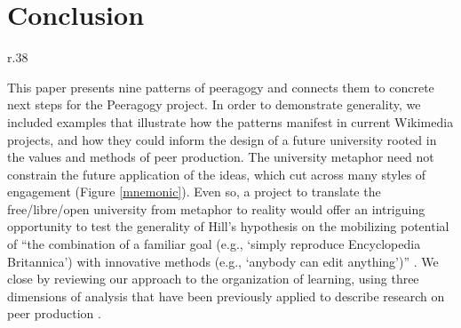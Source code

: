 \section{Conclusion}\label{sec:Conclusion}




\begin{wrapfigure}{r}{.38\textwidth}
\vspace{-2.6cm}
\resizebox{.37\textwidth}{!}{

}
\vspace{-2.5cm}
\captionsetup{font=footnotesize,width=.45\textwidth}
\caption{Mnemonic \label{mnemonic}}
\vspace{-.5cm}
\end{wrapfigure}

This paper presents nine patterns of peeragogy and connects them to
concrete next steps for the Peeragogy project.  In order to
demonstrate generality, we included examples that illustrate how the
patterns manifest in current Wikimedia projects, and how they could
inform the design of a future university rooted in the values and
methods of peer production.
%
The university metaphor need not constrain the future application of
the ideas, which cut across many styles of engagement (Figure \ref{mnemonic}).
Even so, a project to translate the free\slash libre\slash open
university from metaphor to reality would offer an intriguing
opportunity to test the generality of Hill's hypothesis on the
mobilizing potential of ``the combination of a familiar goal (e.g.,
`simply reproduce Encyclopedia Britannica') with innovative methods
(e.g., `anybody can edit anything')'' \cite[p.~13]{mako-thesis}.  We
close by reviewing our approach to the organization of learning, using
three dimensions of analysis that have been previously applied to
describe research on peer production \cite{benkler2015peer}.


